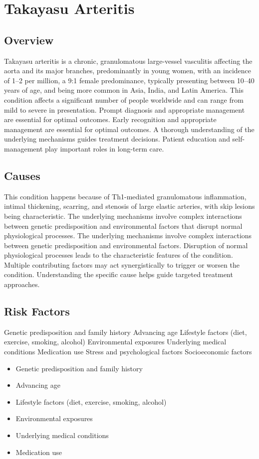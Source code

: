 \chapter{Takayasu Arteritis}
\label{sec:Takayasu Arteritis}

\section{Overview}
Takayasu arteritis is a chronic, granulomatous large-vessel vasculitis affecting the aorta and its major branches, predominantly in young women, with an incidence of 1--2 per million, a 9:1 female predominance, typically presenting between 10--40 years of age, and being more common in Asia, India, and Latin America. This condition affects a significant number of people worldwide and can range from mild to severe in presentation. Prompt diagnosis and appropriate management are essential for optimal outcomes. Early recognition and appropriate management are essential for optimal outcomes. A thorough understanding of the underlying mechanisms guides treatment decisions. Patient education and self-management play important roles in long-term care.
\section{Causes}
This condition happens because of Th1-mediated granulomatous inflammation, intimal thickening, scarring, and stenosis of large elastic arteries, with skip lesions being characteristic. The underlying mechanisms involve complex interactions between genetic predisposition and environmental factors that disrupt normal physiological processes. The underlying mechanisms involve complex interactions between genetic predisposition and environmental factors. Disruption of normal physiological processes leads to the characteristic features of the condition. Multiple contributing factors may act synergistically to trigger or worsen the condition. Understanding the specific cause helps guide targeted treatment approaches.
\section{Risk Factors}
Genetic predisposition and family history Advancing age Lifestyle factors (diet, exercise, smoking, alcohol) Environmental exposures Underlying medical conditions Medication use Stress and psychological factors Socioeconomic factors

\begin{itemize}[noitemsep]
  \item Genetic predisposition and family history
  \item Advancing age
  \item Lifestyle factors (diet, exercise, smoking, alcohol)
  \item Environmental exposures
  \item Underlying medical conditions
  \item Medication use
\end{itemize}
